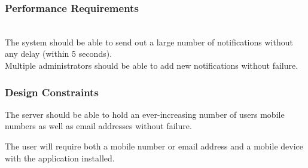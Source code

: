 \documentclass[runningheads,a4paper]{article}
\begin{document}
\subsubsection{Performance Requirements}
\mbox{}\\
The system should be able to send out a large number of notifications without any delay (within 5 seconds).\\
Multiple administrators should be able to add new notifications without failure.



\subsubsection{Design Constraints}

The server should be able to hold an ever-increasing number of users mobile numbers as well as email addresses without failure.  

The user will require both a mobile number or email address and a mobile device with the application installed.
\end{document}
